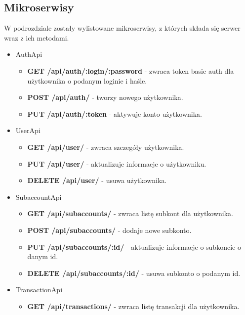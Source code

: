\documentclass{article}
\begin{document}
	\subsection{Mikroserwisy}
	W podrozdziale zostały wylistowane mikroserwisy, z których składa się serwer wraz z ich
	metodami.
	\begin{itemize}
		\item AuthApi
			\begin{itemize}
				\item \textbf{GET /api/auth/:login/:password} - zwraca token basic auth dla użytkownika o podanym loginie i haśle.

				\item \textbf{POST /api/auth/} - tworzy nowego użytkownika.

				\item \textbf{PUT /api/auth/:token} - aktywuje konto użytkownika.
			\end{itemize}
		\item UserApi
			\begin{itemize}

				\item \textbf{GET /api/user/} - zwraca szczegóły użytkownika.

				\item \textbf{PUT /api/user/} - aktualizuje informacje o użytkowniku.

				\item \textbf{DELETE /api/user/} - usuwa użytkownika.

			\end{itemize}
		\item SubaccountApi
			\begin{itemize}
				\item \textbf{GET /api/subaccounts/} - zwraca listę subkont dla użytkownika.

				\item \textbf{POST /api/subaccounts/} - dodaje nowe subkonto.

				\item \textbf{PUT /api/subaccounts/:id/} - aktualizuje informacje o subkoncie o danym id.

				\item \textbf{DELETE /api/subaccounts/:id/} - usuwa subkonto o podanym id.
			\end{itemize}
		\item TransactionApi
			\begin{itemize}
				\item \textbf{GET /api/transactions/} - zwraca listę transakcji dla użytkownika.


\end{itemize}
\end{itemize}
\end{document}
